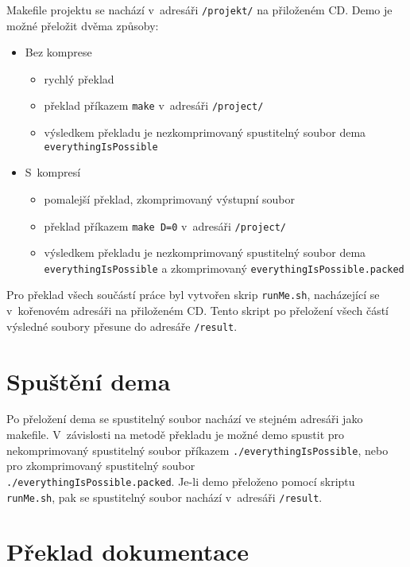 Makefile projektu se nachází v~adresáři \texttt{/projekt/} na přiloženém CD.
Demo je možné přeložit dvěma způsoby:
\begin{itemize}
  \item Bez komprese
    \begin{itemize}
      \item rychlý překlad
      \item překlad příkazem \texttt{make} v~adresáři \texttt{/project/}
      \item výsledkem překladu je nezkomprimovaný spustitelný soubor dema \\ \texttt{everythingIsPossible}
    \end{itemize}

  \item S~kompresí 
    \begin{itemize}
      \item pomalejší překlad, zkomprimovaný výstupní soubor
      \item překlad příkazem \texttt{make D=0} v~adresáři \texttt{/project/}
      \item výsledkem překladu je nezkomprimovaný spustitelný soubor dema \\ \texttt{everythingIsPossible} a zkomprimovaný \texttt{everythingIsPossible.packed} 
    \end{itemize}
\end{itemize}

Pro překlad všech součástí práce byl vytvořen skrip \texttt{runMe.sh}, nacházející se v~kořenovém adresáři na přiloženém CD.
Tento skript po přeložení všech částí výsledné soubory přesune do adresáře \texttt{/result}.

\section{Spuštění dema}
Po přeložení dema se spustitelný soubor nachází ve stejném adresáři jako makefile.
V~závislosti na metodě překladu je možné demo spustit pro nekomprimovaný spustitelný soubor příkazem \texttt{./everythingIsPossible}, nebo pro zkomprimovaný spustitelný soubor \\ \texttt{./everythingIsPossible.packed}.
Je-li demo přeloženo pomocí skriptu \texttt{runMe.sh}, pak se spustitelný soubor nachází v~adresáři \texttt{/result}.

\section{Překlad dokumentace}
